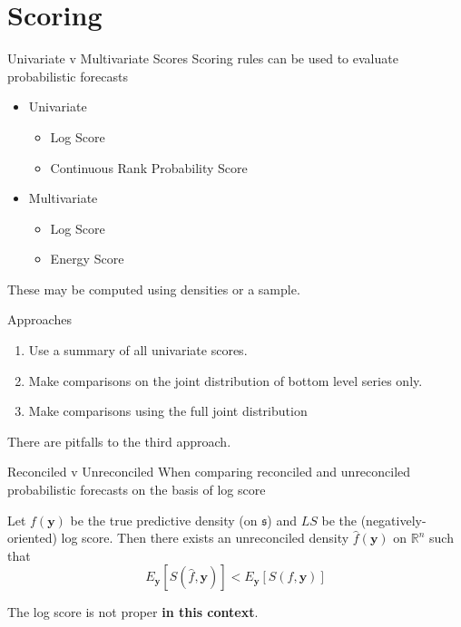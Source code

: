 \documentclass{beamer}
\begin{document}
  \section{Scoring}
  \begin{frame}{Univariate v Multivariate Scores}
    Scoring rules can be used to evaluate probabilistic forecasts
    \begin{itemize}
    	\item Univariate
    	\begin{itemize}
    		\item Log Score
    		\item Continuous Rank Probability Score
    	\end{itemize}
    	\item Multivariate
        \begin{itemize}
	      \item Log Score
	      \item Energy Score
        \end{itemize}
    \end{itemize}
    These may be computed using densities or a sample.
  \end{frame}
  \begin{frame}{Approaches}
  	\begin{enumerate}
  		\item Use a summary of all univariate scores.
  		\item Make comparisons on the joint distribution of bottom level series only.
        \item Make comparisons using the full joint distribution
  \end{enumerate}
  There are pitfalls to the third approach.
  \end{frame}
  \begin{frame}{Reconciled v Unreconciled}
	When comparing reconciled and unreconciled probabilistic forecasts on the basis of log score
	\begin{theorem}
		Let $f(\bm{y})$ be the true predictive density (on $\mathfrak{s}$) and $LS$ be the (negatively-oriented) log score.  Then there exists an unreconciled density  $\hat{f}(\bm{y})$ on $\mathbb{R}^n$ such that
		\begin{equation*}
		E_{\bm y}\left[S(\hat{f},\bm{y})\right]<E_{\bm y}\left[S(f,\bm{y})\right]
		\end{equation*}
	\end{theorem}
    The log score is not proper {\bf in this context}.
  \end{frame}
\end{document}
